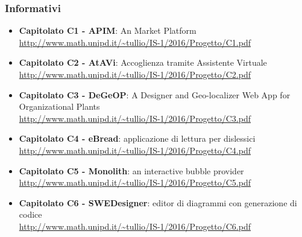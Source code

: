 \subsubsection{Informativi}
\begin{itemize}
	\item \textbf{Capitolato C1 - APIM}: An  Market Platform\\ \url{http://www.math.unipd.it/~tullio/IS-1/2016/Progetto/C1.pdf}
	\item \textbf{Capitolato C2 - AtAVi}: Accoglienza tramite Assistente Virtuale\\
	\url{http://www.math.unipd.it/~tullio/IS-1/2016/Progetto/C2.pdf}
	\item \textbf{Capitolato C3 - DeGeOP}: A Designer and Geo-localizer Web App for Organizational Plants\\ \url{http://www.math.unipd.it/~tullio/IS-1/2016/Progetto/C3.pdf}
	\item \textbf{Capitolato C4 - eBread}: applicazione di lettura per dislessici\\
	\url{http://www.math.unipd.it/~tullio/IS-1/2016/Progetto/C4.pdf}
	\item \textbf{Capitolato C5 - Monolith}: an interactive bubble provider\\ \url{http://www.math.unipd.it/~tullio/IS-1/2016/Progetto/C5.pdf}
	\item \textbf{Capitolato C6 - SWEDesigner}: editor di diagrammi  con generazione di codice\\ \url{http://www.math.unipd.it/~tullio/IS-1/2016/Progetto/C6.pdf}
\end{itemize}